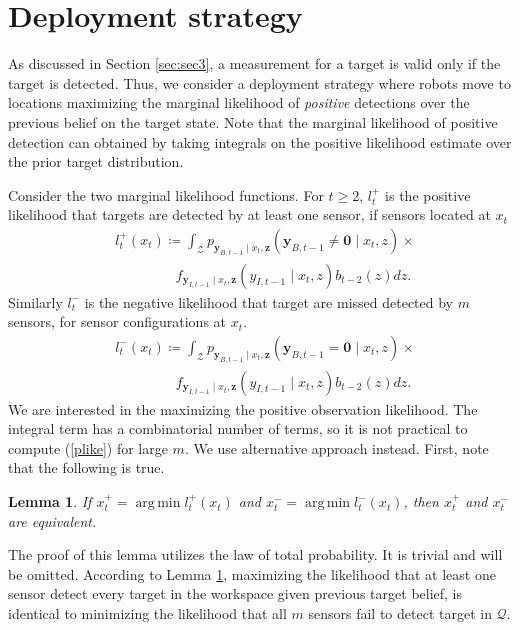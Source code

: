 \documentclass[journal]{IEEEtran}
\newtheorem{lemma}{Lemma}[section]
\DeclareMathOperator*{\argmin}{arg\,min}
\begin{document}
\section{Deployment strategy}
\label{sec:sec5}
As discussed in Section \ref{sec:sec3}, a measurement for a target is valid only if the target is detected. Thus, we consider a deployment strategy where robots move to locations maximizing the marginal likelihood of \emph{positive} detections over the previous belief on the target state. Note that the marginal likelihood of positive detection can obtained by taking integrals on the positive likelihood estimate over the prior target distribution.

Consider the two marginal likelihood functions. For $t \geq 2$, $l_t^{+}$ is the positive likelihood that targets are detected by at least one sensor, if sensors located at $x_t$ 
\begin{align}
&l_t^{+}(x_t)\coloneqq \int_{\mathcal{Z}}
p_{\bm{y}_{B,t-1}\mid x_t,\bm{z}}
\left(
\bm{y}_{B,t-1} \neq \bm{0}
\mid x_t,z
\right) \times \nonumber \\
&\,\,\,\,\,\,\,\,\,\,\,\,\,\,\,\,\,\,\,\,\,\,\,\,\,\,f_{\bm{y}_{I,t-1}\mid x_t,\bm{z}}
\left(
y_{I,t-1}
\mid x_t,z
\right) b_{t-2}(z) dz.
\label{plike}  
\end{align}
Similarly $l_t^{-}$ is the negative likelihood that target are missed detected by $m$ sensors, for sensor configurations at $x_t$.
\begin{align*}
&l_t^{-}(x_t)\coloneqq \int_{\mathcal{Z}}
p_{\bm{y}_{B,t-1}\mid x_t,\bm{z}}
\left(
\bm{y}_{B,t-1}= \bm{0}\mid x_t,z
\right)
 \times \\
&\,\,\,\,\,\,\,\,\,\,\,\,\,\,\,\,\,\,\,\,\,\,\,\,\,\,f_{\bm{y}_{I,t-1}\mid x_t,\bm{z}}
\left(
y_{I,t-1}
\mid x_t,z
\right) b_{t-2}(z)dz. 
\end{align*}
We are interested in the maximizing the positive observation likelihood. The integral term has a combinatorial number of terms,
so it is not practical to compute (\ref{plike}) for large $m$. We use alternative approach instead. First, note that the following is true.
\begin{lemma}
If $x_t^{+} = \argmin l_t^+(x_t)$ and $x_t^{-} = \argmin l_t^-(x_t)$, then $x_t^+$ and $x_t^-$ are equivalent.
\label{lem1}
\end{lemma}
The proof of this lemma utilizes the law of total probability. It is trivial and will be omitted.
According to Lemma \ref{lem1}, maximizing the likelihood that at least one sensor detect every target in the workspace given previous target belief, is identical to minimizing the likelihood that all $m$ sensors fail to detect target in $\mathcal{Q}$.
\end{document}
